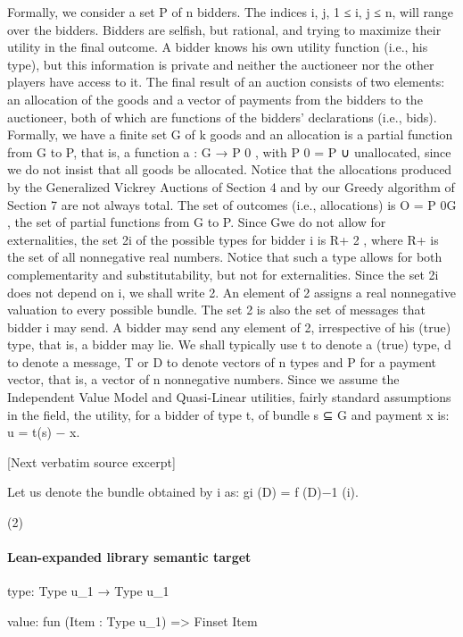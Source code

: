 \documentclass[10pt]{article}
\begin{document}
\begin{ReviewVerbatim}
Formally, we consider a set P of n bidders. The indices i, j, 1 ≤ i, j ≤ n, will
range over the bidders. Bidders are selfish, but rational, and trying to maximize their
utility in the final outcome. A bidder knows his own utility function (i.e., his type),
but this information is private and neither the auctioneer nor the other players have
access to it. The final result of an auction consists of two elements: an allocation
of the goods and a vector of payments from the bidders to the auctioneer, both of
which are functions of the bidders’ declarations (i.e., bids). Formally, we have a
finite set G of k goods and an allocation is a partial function from G to P, that is, a
function a : G → P 0 , with P 0 = P ∪ {unallocated}, since we do not insist that all
goods be allocated. Notice that the allocations produced by the Generalized Vickrey
Auctions of Section 4 and by our Greedy algorithm of Section 7 are not always
total. The set of outcomes (i.e., allocations) is O = P 0G , the set of partial functions
from G to P. Since Gwe do not allow for externalities, the set 2i of the possible types
for bidder i is R+ 2 , where R+ is the set of all nonnegative real numbers. Notice
that such a type allows for both complementarity and substitutability, but not for
externalities. Since the set 2i does not depend on i, we shall write 2. An element
of 2 assigns a real nonnegative valuation to every possible bundle. The set 2 is
also the set of messages that bidder i may send. A bidder may send any element of
2, irrespective of his (true) type, that is, a bidder may lie. We shall typically use t
to denote a (true) type, d to denote a message, T or D to denote vectors of n types
and P for a payment vector, that is, a vector of n nonnegative numbers.
Since we assume the Independent Value Model and Quasi-Linear utilities, fairly
standard assumptions in the field, the utility, for a bidder of type t, of bundle s ⊆ G
and payment x is:
u = t(s) − x.

[Next verbatim source excerpt]

Let us denote the bundle obtained by i as:
gi (D) = f (D)−1 (i).

(2)
\end{ReviewVerbatim}



\paragraph{Lean-expanded library semantic target}
\begin{ReviewVerbatim}
type:
Type u_1 → Type u_1

value:
fun (Item : Type u_1) => Finset Item
\end{ReviewVerbatim}
\end{document}
